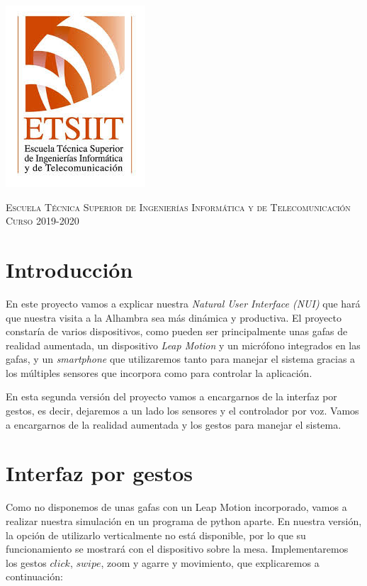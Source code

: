 \documentclass[11pt,a4paper]{article}
\begin{document}
\begin{titlepage}
\begin{minipage}{\textwidth}
\includegraphics[scale=0.3]{img/etsiit.jpeg}

\vspace{0.5cm}
\textsc{Escuela Técnica Superior de Ingenierías Informática y de Telecomunicación}\\
\vspace{0.5cm}
\textsc{Curso 2019-2020}
\end{minipage}
\end{titlepage}

\tableofcontents
\thispagestyle{empty}				%

\newpage

\setlength{\parskip}{1em}


\section{Introducción}
En este proyecto vamos a explicar nuestra \textit{Natural User Interface (NUI)} que hará que nuestra visita a la Alhambra sea más
dinámica y productiva. El proyecto constaría de varios dispositivos, como pueden ser principalmente unas gafas de realidad aumentada,
un dispositivo \textit{Leap Motion} y un micrófono integrados en las gafas, y un \textit{smartphone} que utilizaremos tanto para
manejar el sistema gracias a los múltiples sensores que incorpora como para controlar la aplicación.

En esta segunda versión del proyecto vamos a encargarnos de la interfaz por gestos, es decir, dejaremos a un lado los sensores
y el controlador por voz. Vamos a encargarnos de la realidad aumentada y los gestos para manejar el sistema.

\section{Interfaz por gestos}
Como no disponemos de unas gafas con un Leap Motion incorporado, vamos a realizar nuestra simulación en un programa de python aparte. En
nuestra versión, la opción de utilizarlo verticalmente no está disponible, por lo que su funcionamiento se mostrará con el dispositivo
sobre la mesa. Implementaremos los gestos $click$, $swipe$, zoom y agarre y movimiento, que explicaremos a continuación:
\end{document}
